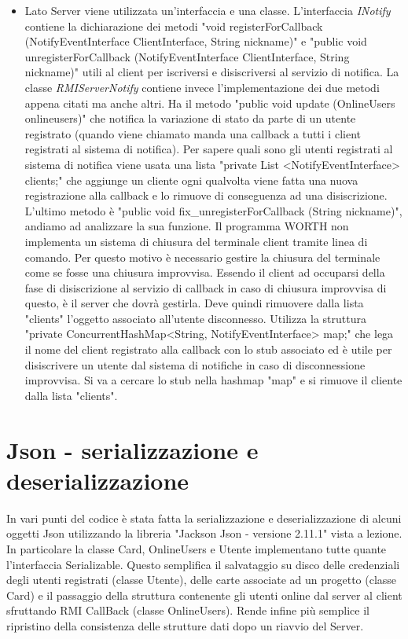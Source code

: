 \documentclass{article} %
\begin{document}
\begin{itemize}
    \item Lato Server viene utilizzata un'interfaccia e una classe. L'interfaccia {\itshape INotify} contiene la dichiarazione dei metodi "void registerForCallback (NotifyEventInterface ClientInterface, String nickname)" e "public void unregisterForCallback (NotifyEventInterface ClientInterface, String nickname)" utili al client per iscriversi e disiscriversi al servizio di notifica. La classe {\itshape RMIServerNotify} contiene invece l'implementazione dei due metodi appena citati ma anche altri. Ha il metodo "public void update (OnlineUsers onlineusers)" che notifica la variazione di stato da parte di un utente registrato (quando viene chiamato manda una callback a tutti i client registrati al sistema di notifica). Per sapere quali sono gli utenti registrati al sistema di notifica viene usata una lista "private List <NotifyEventInterface> clients;" che aggiunge un cliente ogni qualvolta viene fatta una nuova registrazione alla callback e lo rimuove di conseguenza ad una disiscrizione. L'ultimo metodo è "public void fix\_unregisterForCallback (String nickname)", andiamo ad analizzare la sua funzione. Il programma WORTH non implementa un sistema di chiusura del terminale client tramite linea di comando. Per questo motivo è necessario gestire la chiusura del terminale come se fosse una chiusura improvvisa. Essendo il client ad occuparsi della fase di disiscrizione al servizio di callback in caso di chiusura improvvisa di questo, è il server che dovrà gestirla. Deve quindi rimuovere dalla lista "clients" l'oggetto associato all'utente disconnesso. Utilizza la struttura "private ConcurrentHashMap<String, NotifyEventInterface> map;" che lega il nome del client registrato alla callback con lo stub associato ed è utile per disiscrivere un utente dal sistema di notifiche in caso di disconnessione improvvisa. Si va a cercare lo stub nella hashmap "map" e si rimuove il cliente dalla lista "clients".
\end{itemize}
\section{Json - serializzazione e deserializzazione}
In vari punti del codice è stata fatta la serializzazione e deserializzazione di alcuni oggetti Json utilizzando la libreria "Jackson Json - versione 2.11.1" vista a lezione. In particolare la classe Card, OnlineUsers e Utente implementano tutte quante l'interfaccia Serializable. Questo semplifica il salvataggio su disco delle credenziali degli utenti registrati (classe Utente), delle carte associate ad un progetto (classe Card) e il passaggio della struttura contenente gli utenti online dal server al client sfruttando RMI CallBack (classe OnlineUsers). Rende infine più semplice il ripristino della consistenza delle strutture dati dopo un riavvio del Server.
\end{document}
